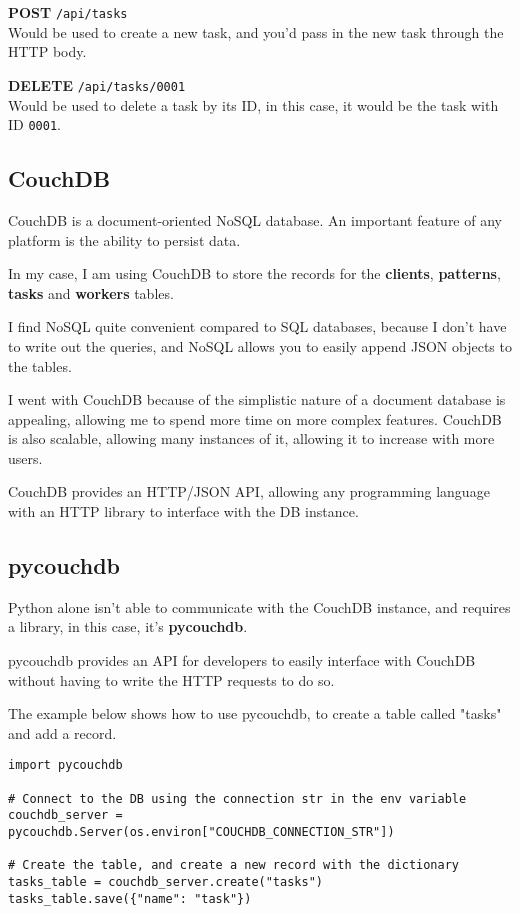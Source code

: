 \textbf{POST} \texttt{/api/tasks} \\
Would be used to create a new task,
and you'd pass in the new task through the HTTP body.

\textbf{DELETE} \texttt{/api/tasks/0001} \\
Would be used to delete a task by its ID,
in this case, it would be the task with ID \texttt{0001}.

\subsection{CouchDB}
CouchDB is a document-oriented NoSQL database.
An important feature of any platform is the ability to persist data.

In my case, I am using CouchDB to store the records for the
\textbf{clients}, \textbf{patterns}, \textbf{tasks} and \textbf{workers} tables.

I find NoSQL quite convenient compared to SQL databases,
because I don't have to write out the queries,
and NoSQL allows you to easily append JSON objects to the tables.

I went with CouchDB because of the simplistic nature of
a document database is appealing,
allowing me to spend more time on more complex features.
CouchDB is also scalable, allowing many instances of it,
allowing it to increase with more users.

CouchDB provides an HTTP/JSON API, allowing any programming language
with an HTTP library to interface with the DB instance.

\subsection{pycouchdb}
Python alone isn't able to communicate with the CouchDB instance,
and requires a library, in this case, it's \textbf{pycouchdb}.

pycouchdb provides an API for developers to easily interface with
CouchDB without having to write the HTTP requests to do so.

The example below shows how to use pycouchdb,
to create a table called "tasks" and add a record.

\begin{lstlisting}
import pycouchdb

# Connect to the DB using the connection str in the env variable
couchdb_server = pycouchdb.Server(os.environ["COUCHDB_CONNECTION_STR"])

# Create the table, and create a new record with the dictionary
tasks_table = couchdb_server.create("tasks")
tasks_table.save({"name": "task"})
\end{lstlisting}


